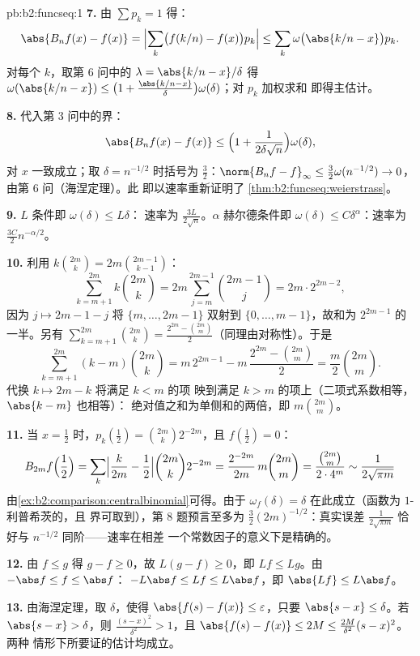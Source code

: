 \begin{solution}{pb:b2:funcseq:1}
\textbf{7.} 由 $\sum p_k = 1$ 得：
\[
\abs{B_nf(x) - f(x)}
= \Bigl|\sum_k\bigl(f(k/n) - f(x)\bigr)p_k\Bigr|
\leq \sum_k\omega\bigl(\abs{k/n - x}\bigr)p_k .
\]
对每个 $k$，取第 6 问中的 $\lambda = \abs{k/n - x}/\delta$
得 $\omega(\abs{k/n-x}) \leq \bigl(1 +
\frac{\abs{k/n-x}}\delta\bigr)\omega(\delta)$；对 $p_k$ 加权求和
即得主估计。

\textbf{8.} 代入第 3 问中的界：
\[
\abs{B_nf(x) - f(x)} \leq \Bigl(1 +
\frac{1}{2\delta\sqrt n}\Bigr)\omega(\delta),
\]
对 $x$ 一致成立；取 $\delta = n^{-1/2}$ 时括号为
$\frac32$：$\norm{B_nf - f}_\infty \leq
\frac32\omega(n^{-1/2}) \to 0$，由第 6 问（海涅定理）。此
即以速率重新证明了 \cref{thm:b2:funcseq:weierstrass}。

\textbf{9.} $L$ 条件即 $\omega(\delta) \leq L\delta$：
速率为 $\frac{3L}{2\sqrt n}$。$\alpha$ 赫尔德条件即
$\omega(\delta) \leq C\delta^\alpha$：速率为 $\frac{3C}{2}
n^{-\alpha/2}$。

\textbf{10.} 利用 $k\binom{2m}k = 2m\binom{2m-1}{k-1}$：
\[
\sum_{k=m+1}^{2m}k\binom{2m}k
= 2m\sum_{j=m}^{2m-1}\binom{2m-1}{j}
= 2m\cdot 2^{2m-2},
\]
因为 $j \mapsto 2m-1-j$ 将 $\{m,\dots,2m-1\}$ 双射到
$\{0,\dots,m-1\}$，故和为 $2^{2m-1}$ 的一半。另有
$\sum_{k=m+1}^{2m}\binom{2m}k = \frac{2^{2m} -
\binom{2m}m}{2}$（同理由对称性）。于是
\[
\sum_{k=m+1}^{2m}(k-m)\binom{2m}k
= m\,2^{2m-1} - m\,\frac{2^{2m} - \binom{2m}m}{2}
= \frac m2\binom{2m}m .
\]
代换 $k \mapsto 2m-k$ 将满足 $k < m$ 的项
映到满足 $k > m$ 的项上（二项式系数相等，$\abs{k-m}$ 也相等）：
绝对值之和为单侧和的两倍，即 $m\binom{2m}m$。

\textbf{11.} 当 $x = \frac12$ 时，$p_k(\tfrac12) =
\binom{2m}k2^{-2m}$，且 $f(\tfrac12) = 0$：
\[
B_{2m}f\Bigl(\frac12\Bigr)
= \sum_k\Bigl|\frac{k}{2m} - \frac12\Bigr|
\binom{2m}k 2^{-2m}
= \frac{2^{-2m}}{2m}\,m\binom{2m}m
= \frac{\binom{2m}m}{2\cdot4^m}
\sim \frac{1}{2\sqrt{\pi m}}
\]
由\cref{ex:b2:comparison:centralbinomial}可得。由于 $\omega_f
(\delta) = \delta$ 在此成立（函数为 $1$-利普希茨的，且
界可取到），第 8 题预言至多为
$\frac32(2m)^{-1/2}$：真实误差 $\frac{1}{2\sqrt{\pi m}}$
恰好与 $n^{-1/2}$ 同阶——速率在相差
一个常数因子的意义下是精确的。

\textbf{12.} 由 $f \leq g$ 得 $g - f \geq 0$，故 $L(g-f) \geq
0$，即 $Lf \leq Lg$。由 $-\abs f \leq f \leq \abs f$：
$-L\abs f \leq Lf \leq L\abs f$，即 $\abs{Lf} \leq
L\abs f$。

\textbf{13.} 由海涅定理，取 $\delta$，使得 $\abs{f(s)-f(x)}
\leq \varepsilon$，只要 $\abs{s-x} \leq \delta$。若
$\abs{s - x} > \delta$，则 $\frac{(s-x)^2}{\delta^2} > 1$，且
$\abs{f(s)-f(x)} \leq 2M \leq \frac{2M}{\delta^2}(s-x)^2$。两种
情形下所要证的估计均成立。


\end{solution}
